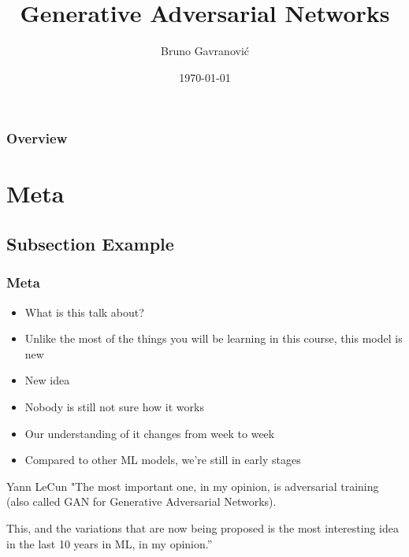 \documentclass{beamer}
\title[GAN]{Generative Adversarial Networks} %
\author{Bruno Gavranović} %
\institute[PSIML2017] %
{
Petnica Summer School of Machine Learning\\ %
\medskip
\textit{bruno.gavranovic@fer.hr} %
}
\date{\today} %
\begin{document}
\begin{frame}
\titlepage %
\end{frame}

\begin{frame}
\frametitle{Overview} %
\tableofcontents %
\end{frame}


\section{Meta} %

\subsection{Subsection Example} %

\begin{frame}
\frametitle{Meta}
\begin{itemize}
	\item What is this talk about?
	\item Unlike the most of the things you will be learning in this course, this model is new
	\item New idea
	\item Nobody is still not sure how it works
	\item Our understanding of it changes from week to week
	\item Compared to other ML models, we're still in early stages
\end{itemize}
\begin{block}{Yann LeCun}
"The most important one, in my opinion, is adversarial training (also called GAN for Generative Adversarial Networks).

This, and the variations that are now being proposed is the most interesting idea in the last 10 years in ML, in my opinion.”
\end{block}
\end{frame}
\end{document}
